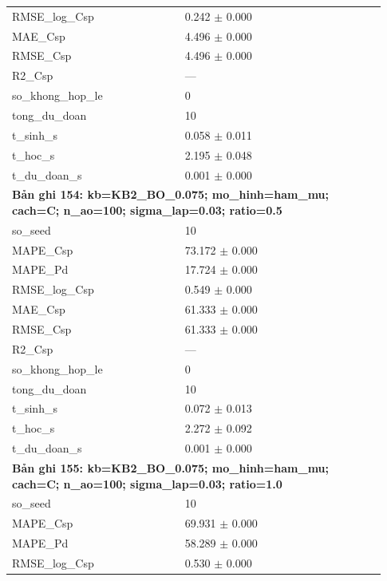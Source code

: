 \begin{longtable}{p{0.43\linewidth}p{0.50\linewidth}}
RMSE\_\allowbreak log\_\allowbreak Csp & 0.242 $\pm$ 0.000 \\
MAE\_\allowbreak Csp & 4.496 $\pm$ 0.000 \\
RMSE\_\allowbreak Csp & 4.496 $\pm$ 0.000 \\
R2\_\allowbreak Csp & — \\
so\_\allowbreak khong\_\allowbreak hop\_\allowbreak le & 0 \\
tong\_\allowbreak du\_\allowbreak doan & 10 \\
t\_\allowbreak sinh\_\allowbreak s & 0.058 $\pm$ 0.011 \\
t\_\allowbreak hoc\_\allowbreak s & 2.195 $\pm$ 0.048 \\
t\_\allowbreak du\_\allowbreak doan\_\allowbreak s & 0.001 $\pm$ 0.000 \\
\midrule
\multicolumn{2}{p{0.95\linewidth}}{\textbf{Bản ghi 154: kb=KB2\_BO\_0.075; mo\_hinh=ham\_mu; cach=C; n\_ao=100; sigma\_lap=0.03; ratio=0.5}} \\
so\_\allowbreak seed & 10 \\
MAPE\_\allowbreak Csp & 73.172 $\pm$ 0.000 \\
MAPE\_\allowbreak Pd & 17.724 $\pm$ 0.000 \\
RMSE\_\allowbreak log\_\allowbreak Csp & 0.549 $\pm$ 0.000 \\
MAE\_\allowbreak Csp & 61.333 $\pm$ 0.000 \\
RMSE\_\allowbreak Csp & 61.333 $\pm$ 0.000 \\
R2\_\allowbreak Csp & — \\
so\_\allowbreak khong\_\allowbreak hop\_\allowbreak le & 0 \\
tong\_\allowbreak du\_\allowbreak doan & 10 \\
t\_\allowbreak sinh\_\allowbreak s & 0.072 $\pm$ 0.013 \\
t\_\allowbreak hoc\_\allowbreak s & 2.272 $\pm$ 0.092 \\
t\_\allowbreak du\_\allowbreak doan\_\allowbreak s & 0.001 $\pm$ 0.000 \\
\midrule
\multicolumn{2}{p{0.95\linewidth}}{\textbf{Bản ghi 155: kb=KB2\_BO\_0.075; mo\_hinh=ham\_mu; cach=C; n\_ao=100; sigma\_lap=0.03; ratio=1.0}} \\
so\_\allowbreak seed & 10 \\
MAPE\_\allowbreak Csp & 69.931 $\pm$ 0.000 \\
MAPE\_\allowbreak Pd & 58.289 $\pm$ 0.000 \\
RMSE\_\allowbreak log\_\allowbreak Csp & 0.530 $\pm$ 0.000 \\

\end{longtable}
